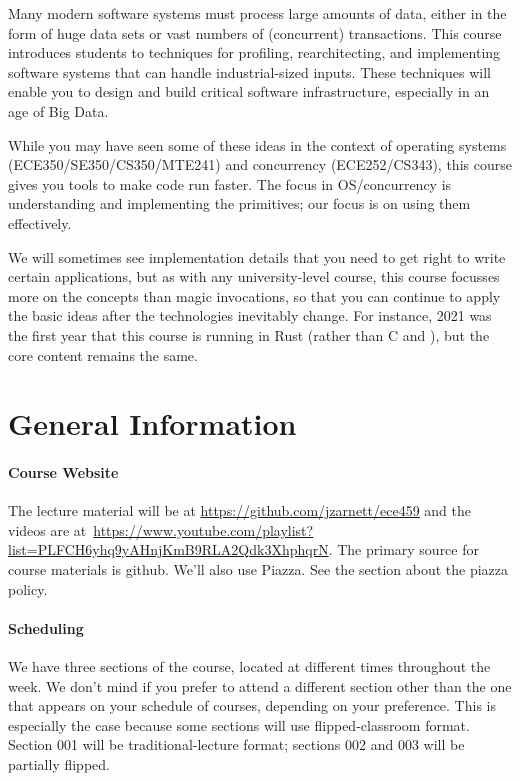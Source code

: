 Many modern software systems must process large amounts of data, either in the
form of huge data sets or vast numbers of (concurrent) transactions.  This
course introduces students to techniques for profiling, rearchitecting, and
implementing software systems that can handle industrial-sized
inputs. These techniques will enable you to design and build
critical software infrastructure, especially in an age of Big Data.

While you may have seen some of these ideas in the context of
operating systems (ECE350/SE350/CS350/MTE241) and concurrency (ECE252/CS343), this course gives you tools to make code run
faster. The focus in OS/concurrency is understanding and implementing the
primitives; our focus is on using them effectively. 

We will sometimes see implementation details that you need to get right to write
certain applications, but as with any university-level course, this course
focusses more on the concepts than magic invocations, so that you can continue
to apply the basic ideas after the technologies inevitably change. For instance,
2021 was the first year that this course is running in Rust (rather than C and \CPP),
but the core content remains the same.


\section*{General Information}

\paragraph{Course Website} The lecture material will be at \url{https://github.com/jzarnett/ece459} and the videos are at~\url{https://www.youtube.com/playlist?list=PLFCH6yhq9yAHnjKmB9RLA2Qdk3XhphqrN}.  The primary source for course materials is github. We'll also use Piazza. See the section about the piazza policy.

\paragraph{Scheduling}
We have three sections of the course, located at different times throughout the week. We don't mind if you prefer to attend a different section other than the one that appears on your schedule of courses, depending on your preference. This is especially the case because some sections will use flipped-classroom format. Section 001 will be traditional-lecture format; sections 002 and 003 will be partially flipped.  

